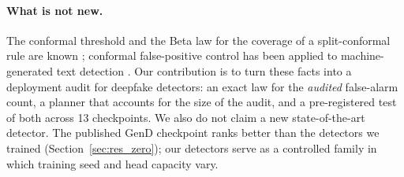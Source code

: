 \paragraph{What is not new.} The conformal threshold and the Beta law for the coverage of a split-conformal rule are known \citep{vovk2012conditional,bates2023testing}; conformal false-positive control has been applied to machine-generated text detection \citep{zhu2025reliably}. Our contribution is to turn these facts into a deployment audit for deepfake detectors: an exact law for the \emph{audited} false-alarm count, a planner that accounts for the size of the audit, and a pre-registered test of both across 13 checkpoints. We also do not claim a new state-of-the-art detector. The published GenD checkpoint ranks better than the detectors we trained (Section~\ref{sec:res_zero}); our detectors serve as a controlled family in which training seed and head capacity vary.
